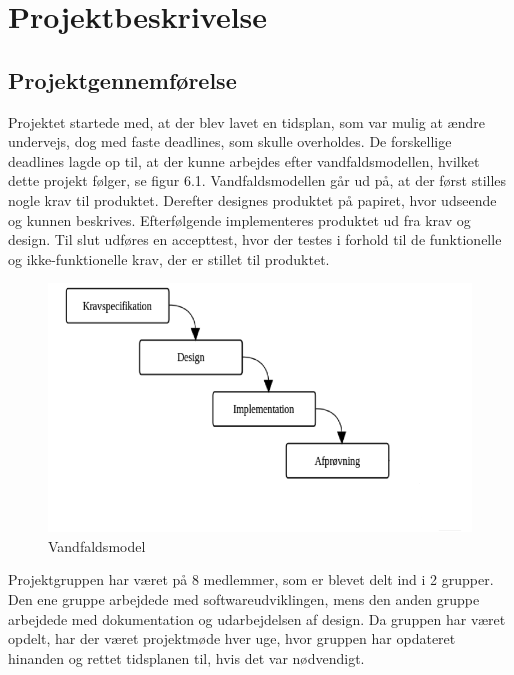 \chapter{Projektbeskrivelse}

\section{Projektgennemførelse}
Projektet startede med, at der blev lavet en tidsplan, som var mulig at ændre undervejs, dog med faste deadlines, som skulle overholdes. De forskellige deadlines lagde op til, at der kunne arbejdes efter vandfaldsmodellen, hvilket dette projekt følger, se figur 6.1. Vandfaldsmodellen går ud på, at der først stilles nogle krav til produktet. Derefter designes produktet på papiret, hvor udseende og kunnen beskrives. Efterfølgende implementeres produktet ud fra krav og design. Til slut udføres en accepttest, hvor der testes i forhold til de funktionelle og ikke-funktionelle krav, der er stillet til produktet.

\begin{figure}[H]
	\centering
	\includegraphics[width=1\textwidth]{Figurer/Snip20150522_15}
	\caption{Vandfaldsmodel}
\end{figure}

Projektgruppen har været på 8 medlemmer, som er blevet delt ind i 2 grupper. Den ene gruppe arbejdede med softwareudviklingen, mens den anden gruppe arbejdede med dokumentation og udarbejdelsen af design. Da gruppen har været opdelt, har der været projektmøde hver uge, hvor gruppen har opdateret hinanden og rettet tidsplanen til, hvis det var nødvendigt.


